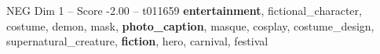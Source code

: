 \begin{textsample}{NEG Dim 1 – Score -2.00 – t011659}  \label{ex:f1_neg_020}
\textbf{entertainment}, fictional\_character, costume, demon, mask, \textbf{photo\_caption}, masque, cosplay, costume\_design, supernatural\_creature, \textbf{fiction}, hero, carnival, festival

\end{textsample}
